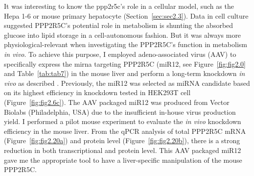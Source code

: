 It was interesting to know the \gls{ppp2r5c}'s role in a cellular model, such as the Hepa 1-6 or mouse primary hepatocyte (Section~\ref{sec:sec2.3}). Data in cell culture suggested PPP2R5C's potential role in metabolism is shunting the absorbed glucose into lipid storage in a cell-autonomous fashion. But it was always more physiological-relevant when investigating the PPP2R5C's function in metabolism \textit{in vivo}. To achieve this purpose, I employed adeno-associated virus (AAV) to specifically express the \gls{mirna} targeting PPP2R5C (miR12, see Figure~\ref{fig:fig2.0} and Table~\ref{tab:tab7}) in the mouse liver and perform a long-term knockdown \textit{in vivo} as described \cite{kulozik_hepatic_2011}. Previously, the miR12 was selected as miRNA candidate based on its highest efficiency in knockdown tested in HEK293T cell (Figure~\ref{fig:fig2.6c}). The \gls{AAV} packaged miR12 was produced from Vector Biolabs (Philadelphia, USA) due to the  insufficient in-house virus production yield. I performed a pilot mouse experiment  to evaluate the \textit{in vivo} knockdown efficiency in the mouse liver. From the qPCR analysis of total PPP2R5C mRNA (Figure~\ref{fig:fig2.20a}) and protein level (Figure~\ref{fig:fig2.20b}), there is a strong reduction in both transcriptional and protein level. This AAV packaged miR12 gave me the appropriate tool to have a liver-specific manipulation of the mouse PPP2R5C. 

